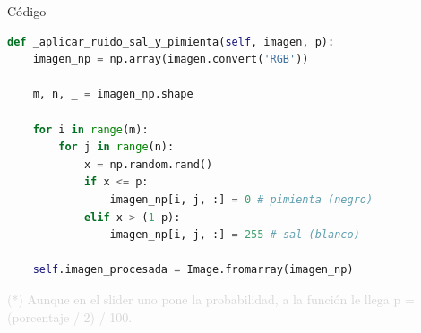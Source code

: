 \documentclass{beamer}
\begin{document}
\begin{frame}[fragile]{Código}
	\justifying
	
	\begin{lstlisting}[language=Python]
def _aplicar_ruido_sal_y_pimienta(self, imagen, p):
	imagen_np = np.array(imagen.convert('RGB'))
	
	m, n, _ = imagen_np.shape
	
	for i in range(m):
		for j in range(n):
			x = np.random.rand()
			if x <= p:
				imagen_np[i, j, :] = 0 # pimienta (negro)
			elif x > (1-p):
				imagen_np[i, j, :] = 255 # sal (blanco)
	
	self.imagen_procesada = Image.fromarray(imagen_np)
	\end{lstlisting}
	
	\vfill
	\footnotesize \textcolor{lightgray}{(*) Aunque en el slider uno pone la probabilidad, a la función le llega p = (porcentaje / 2) / 100.}
\end{frame}
\end{document}
